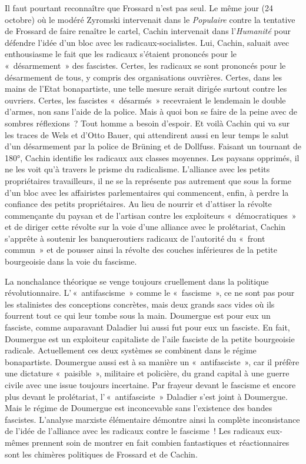 \documentclass[french,twoside]{book} %
\begin{document}
Il faut pourtant reconnaître que Frossard n’est pas seul. Le même jour (24 octobre) où le modéré Zyromski intervenait dans le \emph{Populaire} contre la tentative de Frossard de faire renaître le cartel, Cachin intervenait dans l’\emph{Humanité} pour défendre l’idée d’un bloc avec les radicaux-socialistes.  Lui, Cachin, saluait avec enthousiasme le fait que les radicaux s’étaient prononcés pour le « désarmement » des fascistes. Certes, les radicaux se sont prononcés pour le désarmement de tous, y compris des organisations ouvrières. Certes, dans les mains de l’Etat bonapartiste, une telle mesure serait dirigée surtout contre les ouvriers. Certes, les fascistes « désarmés » recevraient le lendemain le double d’armes, non sans l’aide de la police. Mais à quoi bon se faire de la peine avec de sombres réflexions ? Tout homme a besoin d’espoir. Et voilà Cachin qui va sur les traces de Wels et d’Otto Bauer, qui attendirent aussi en leur temps le salut d’un désarmement par la police de Brüning et de Dollfuss. Faisant un tournant de 180°, Cachin identifie les radicaux aux classes moyennes. Les paysans opprimés, il ne les voit qu’à travers le prisme du radicalisme. L’alliance avec les petits propriétaires travailleurs, il ne se la représente pas autrement que sous la forme d’un bloc avec les affairistes parlementaires qui commencent, enfin, à perdre la confiance des petits propriétaires. Au lieu de nourrir et d’attiser la révolte commençante du paysan et de l’artisan contre les exploiteurs « démocratiques » et de diriger cette révolte sur la voie d’une alliance avec le prolétariat, Cachin s’apprête à soutenir les banqueroutiers radicaux de l’autorité du « front commun » et de pousser ainsi la révolte des couches inférieures de la petite bourgeoisie dans la voie du fascisme.\par
La nonchalance théorique se venge toujours cruellement dans la politique révolutionnaire. L’ « antifascisme » comme le « fascisme », ce ne sont pas pour les stalinistes des conceptions concrètes, mais deux grands sacs vides où ils fourrent tout ce qui leur tombe sous la main. Doumergue est pour eux un fasciste, comme auparavant Daladier lui aussi fut pour eux un fasciste. En fait, Doumergue est un exploiteur capitaliste de l’aile fasciste de la petite bourgeoisie radicale. Actuellement ces deux systèmes se  combinent dans le régime bonapartiste. Doumergue aussi est à sa manière un « antifasciste », car il préfère une dictature « paisible », militaire et policière, du grand capital à une guerre civile avec une issue toujours incertaine. Par frayeur devant le fascisme et encore plus devant le prolétariat, l’ « antifasciste » Daladier s’est joint à Doumergue. Mais le régime de Doumergue est inconcevable sans l’existence des bandes fascistes. L’analyse marxiste élémentaire démontre ainsi la complète inconsistance de l’idée de l’alliance avec les radicaux contre le fascisme ! Les radicaux eux-mêmes prennent soin de montrer en fait combien fantastiques et réactionnaires sont les chimères politiques de Frossard et de Cachin.
\end{document}
